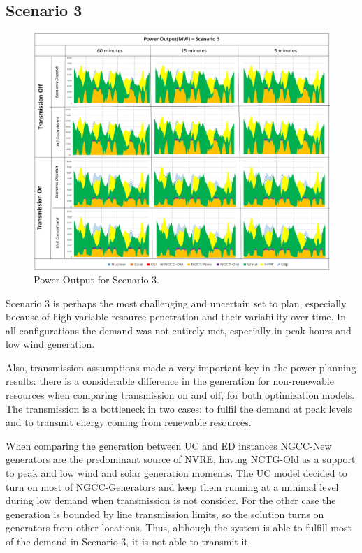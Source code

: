 \documentclass[12pt,LUDisStyle,twosided]{book}
\begin{document}
\newpage
\subsection{Scenario 3}

\begin{figure}[H] 
  \centering
	  \includegraphics[width=\textwidth,height=\textheight,keepaspectratio]{PowerOutputScenario3.png}
  \caption{Power Output for Scenario 3.}
  \label{fig:powerOutputScenario3}
\end{figure}

Scenario 3 is perhaps the most challenging and uncertain set to plan, especially because of high variable resource penetration and their variability over time. In all configurations the demand was not entirely met, especially in peak hours and low wind generation. 

Also, transmission assumptions made a very important key in the power planning results: there is a considerable difference in the generation for non-renewable resources when comparing transmission on and off, for both optimization models. The transmission is a bottleneck in two cases: to fulfil the demand at peak levels and to transmit energy coming from renewable resources. 

When comparing the generation between UC and ED instances NGCC-New generators are the predominant source of NVRE, having NCTG-Old as a support to peak and low wind and solar generation moments. The UC model decided to turn on most of NGCC-Generators and keep them running at a minimal level during low demand when transmission is not consider. For the other case the generation is bounded by line transmission limits, so the solution turns on generators from other locations. Thus, although the system is able to fulfill most of the demand in Scenario 3, it is not able to transmit it.
\end{document}
